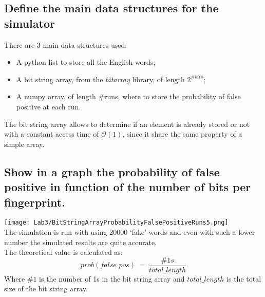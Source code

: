 \documentclass{report}
\begin{document}
{			\subsection{Define the main data structures for the simulator}
						There are 3 main data structures used: 
							\begin{itemize}
								\item A python list to store all the English words;
								\item A bit string array,  from the \emph{bitarray} library, of length $2^{\#bits}$;
								\item A numpy array, of length \#runs, where to store the probability of false positive at each run.
							\end{itemize}
					The bit string array allows to determine if an element is already stored or not with a constant access time of $\mathcal{O}(1)$, since it share the same property of a simple array.
					
			\subsection{Show in a graph the probability of false positive in function of the number of bits per fingerprint.}
			\texttt{[image: Lab3/BitStringArrayProbabilityFalsePositiveRuns5.png]} \\
			The simulation is run with using 20000 `fake' words and even with such a lower number the simulated results are quite accurate. \\
			The theoretical value is calculated as:
			\begin{equation}\label{eq:1}
						prob(false\_pos) \: = \: \frac{\#1s}{total\_length}
			\end{equation}
			Where $\#1$ is the number of 1s in the bit string array and $total\_length$ is the total size of the bit string array.
			
			
			
}
\end{document}
